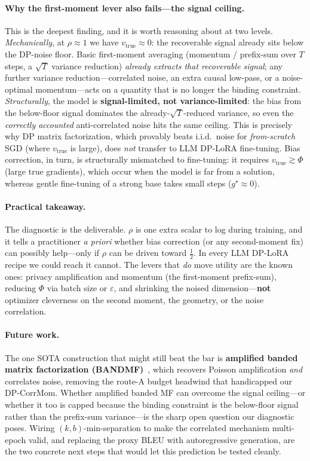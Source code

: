 \documentclass[11pt]{article}
\theoremstyle{plain}
\theoremstyle{definition}
\theoremstyle{remark}
\begin{document}
\paragraph{Why the first-moment lever also fails---the signal ceiling.}
This is the deepest finding, and it is worth reasoning about at two levels. \emph{Mechanically},
at $\rho\approx1$ we have $v_{\mathrm{true}}\approx0$: the recoverable signal already sits below
the DP-noise floor. Basic first-moment averaging (momentum / prefix-sum over $T$ steps, a
$\sqrt{T}$ variance reduction) \emph{already extracts that recoverable signal}; any further
variance reduction---correlated noise, an extra causal low-pass, or a noise-optimal momentum---acts
on a quantity that is no longer the binding constraint. \emph{Structurally}, the model is
\textbf{signal-limited, not variance-limited}: the bias from the below-floor signal dominates the
already-$\sqrt{T}$-reduced variance, so even the \emph{correctly accounted} anti-correlated noise
hits the same ceiling. This is precisely why DP matrix factorization, which provably beats
i.i.d.\ noise for \emph{from-scratch} SGD (where $v_{\mathrm{true}}$ is large), does \emph{not}
transfer to LLM DP-LoRA fine-tuning. Bias correction, in turn, is structurally mismatched to
fine-tuning: it requires $v_{\mathrm{true}}\gtrsim\Phi$ (large true gradients), which occur when
the model is far from a solution, whereas gentle fine-tuning of a strong base takes small steps
($g^\star\!\approx\!0$).

\paragraph{Practical takeaway.}
The diagnostic is the deliverable. $\rho$ is one extra scalar to log during training, and it
tells a practitioner \emph{a priori} whether bias correction (or any second-moment fix) can
possibly help---only if $\rho$ can be driven toward $\tfrac12$. In every LLM DP-LoRA recipe we
could reach it cannot. The levers that \emph{do} move utility are the known ones: privacy
amplification and momentum (the first-moment prefix-sum), reducing $\Phi$ via batch size or
$\varepsilon$, and shrinking the noised dimension---\textbf{not} optimizer cleverness on the
second moment, the geometry, or the noise correlation.

\paragraph{Future work.}
The one SOTA construction that might still beat the bar is \textbf{amplified banded matrix
factorization (BANDMF)}~\citep{choquettechoo2023amplified}, which recovers Poisson amplification
\emph{and} correlates noise, removing the route-A budget headwind that handicapped our DP-CorrMom.
Whether amplified banded MF can overcome the signal ceiling---or whether it too is capped because
the binding constraint is the below-floor signal rather than the prefix-sum variance---is the
sharp open question our diagnostic poses. Wiring $(k,b)$-min-separation
\citep{kalinin2024banded} to make the correlated mechanism multi-epoch valid, and replacing the
proxy BLEU with autoregressive generation, are the two concrete next steps that would let this
prediction be tested cleanly.
\end{document}
